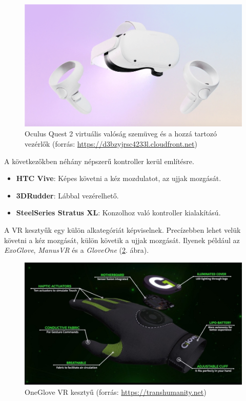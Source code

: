 \begin{figure}[htp]
    \centering
   	\includegraphics[scale=1]{images/oculus.png}
	\caption{Oculus Quest 2 virtuális valóság szemüveg és a hozzá tartozó vezérlők (forrás: \url{https://d3bzyjrsc4233l.cloudfront.net})}
	\label{fig:occulus}
\end{figure}

A következőkben néhány népszerű kontroller kerül említésre.
\begin{itemize}
\item \textbf{HTC Vive}: Képes követni a kéz mozdulatot, az ujjak mozgását.
\item \textbf{3DRudder}: Lábbal vezérelhető.
\item \textbf{SteelSeries Stratus XL}: Konzolhoz való kontroller kialakítású.
\end{itemize}

A VR kesztyűk egy külön alkategóriát képviselnek.
Precízebben lehet velük követni a kéz mozgását, külön követik a ujjak mozgását.
Ilyenek például az \textit{ExoGlove}, \textit{ManusVR} és a \textit{GloveOne} (\ref{fig:gloveone}. ábra).

\begin{figure}[htp]
    \centering
   	\includegraphics[scale=0.6]{images/gloveone.jpg}
	\caption{OneGlove VR kesztyű (forrás: \url{https://transhumanity.net})}
	\label{fig:gloveone}
\end{figure}

